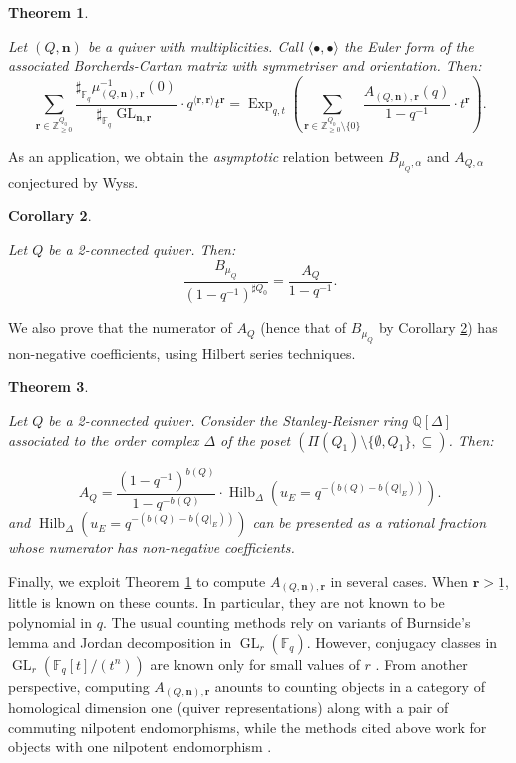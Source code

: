 \documentclass[11pt,english]{article}
\numberwithin{equation}{section}
\numberwithin{figure}{section}
\theoremstyle{definition}
\theoremstyle{plain}
\newtheorem{thmintro}{Theorem}
\newtheorem{corintro}[thmintro]{Corollary}
\theoremstyle{remark}
\DeclareMathOperator{\GL}{GL}
\DeclareMathOperator{\Exp}{Exp}
\DeclareMathOperator{\Hilb}{Hilb}
\newcommand\nn{\mathbf{n}}
\newcommand\rr{\mathbf{r}}
\newcommand\ZZ{\mathbb{Z}}
\newcommand\QQ{\mathbb{Q}}
\newcommand\FF{\mathbb{F}}
\begin{document}
\begin{thmintro} \label{Thm/IntroExpFmlKacPol}

Let $(Q,\nn)$ be a quiver with multiplicities. Call $\langle\bullet,\bullet\rangle$
the Euler form of the associated Borcherds-Cartan matrix with symmetriser
and orientation. Then: \[
\sum_{\rr\in\ZZ_{\geq0}^{Q_0}}
\frac{\sharp_{\FF_q}\mu_{(Q,\nn),\rr}^{-1}(0)}{\sharp_{\FF_q}\GL_{\nn,\rr}}
\cdot q^{\langle\rr,\rr\rangle}t^{\rr}
=
\Exp_{q,t}\left(
\sum_{\rr\in\ZZ_{\geq0}^{Q_0}\setminus\{0\}}
\frac{A_{(Q,\nn),\rr}(q)}{1-q^{-1}}\cdot t^{\rr}
\right).
\]

\end{thmintro}

As an application, we obtain the \textit{asymptotic} relation between
$B_{\mu_{Q},\alpha}$ and $A_{Q,\alpha}$ conjectured by Wyss.

\begin{corintro} \label{Cor/IntroWyssConjAvsB}

Let $Q$ be a 2-connected quiver. Then: \[
\frac{B_{\mu_{Q}}}{(1-q^{-1})^{\sharp Q_0}}=\frac{A_{Q}}{1-q^{-1}}.
\]

\end{corintro}

We also prove that the numerator of $A_{Q}$ (hence that of $B_{\mu_{Q}}$
by Corollary \ref{Cor/IntroWyssConjAvsB}) has non-negative coefficients,
using Hilbert series techniques.

\begin{thmintro} \label{Thm/IntroWyssConjPositivity}

Let $Q$ be a 2-connected quiver. Consider the Stanley-Reisner ring
$\QQ[\Delta]$ associated to the order complex $\Delta$ of the poset
$(\Pi(Q_{1})\setminus\{\emptyset,Q_{1}\},\subseteq)$. Then:

\[
A_Q=\frac{(1-q^{-1})^{b(Q)}}{1-q^{-b(Q)}}\cdot\Hilb_{\Delta}\left(u_{E}=q^{-(b(Q)-b(Q\vert_{E}))}\right).
\] and $\Hilb_{\Delta}\left(u_{E}=q^{-(b(Q)-b(Q\vert_{E}))}\right)$
can be presented as a rational fraction whose numerator has non-negative
coefficients.

\end{thmintro}

Finally, we exploit Theorem \ref{Thm/IntroExpFmlKacPol} to compute
$A_{(Q,\nn),\rr}$ in several cases. When $\rr>\underline{1}$, little
is known on these counts. In particular, they are not known to be
polynomial in $q$. The usual counting methods \cite{Kac83,Hua00,S16,MS20,BSV20}
rely on variants of Burnside's lemma and Jordan decomposition in $\GL_{r}(\FF_{q})$.
However, conjugacy classes in $\GL_{r}(\FF_{q}[t]/(t^{n}))$ are known
only for small values of $r$ \cite{AOPV09,AKOV16}. From another
perspective, computing $A_{(Q,\nn),\rr}$ anounts to counting objects
in a category of homological dimension one (quiver representations)
along with a pair of commuting nilpotent endomorphisms, while the
methods cited above work for objects with one nilpotent endomorphism
\cite[Rem. 5.3.]{Moz19}.
\end{document}
